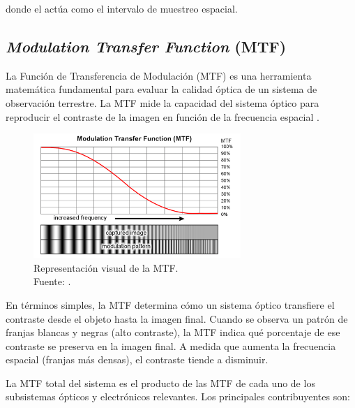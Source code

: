 donde el  actúa como el intervalo de muestreo espacial.

\subsection{\textit{Modulation Transfer Function} (MTF)}\label{sec:mtfteoria}

La Función de Transferencia de Modulación (MTF) es una herramienta matemática fundamental para evaluar la calidad óptica de un sistema de observación terrestre. La MTF mide la capacidad del sistema óptico para reproducir el contraste de la imagen en función de la frecuencia espacial \cite{design_workshop_optical_2023} \cite{zorita_mtf_2023}.

\begin{figure}[H]
    \centering
    \includegraphics[width=0.7\textwidth]{3.Conceptos_Previos/MTF.png}
    \caption{Representación visual de la MTF.\\ Fuente: \cite{EdmundOptics2023}.}
    \label{fig:MTF}
\end{figure}

En términos simples, la MTF determina cómo un sistema óptico transfiere el contraste desde el objeto hasta la imagen final. Cuando se observa un patrón de franjas blancas y negras (alto contraste), la MTF indica qué porcentaje de ese contraste se preserva en la imagen final. A medida que aumenta la frecuencia espacial (franjas más densas), el contraste tiende a disminuir.


La MTF total del sistema es el producto de las MTF de cada uno de los subsistemas ópticos y electrónicos relevantes. Los principales contribuyentes son:

